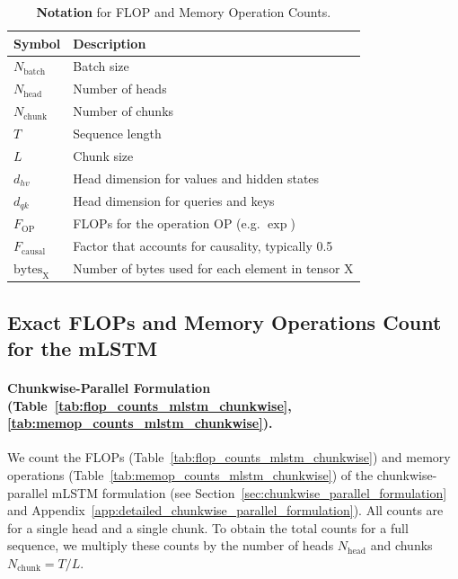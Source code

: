 \documentclass{article}
\begin{document}
    \begin{table}[htbp]
        \vspace{-0.3cm}
        \centering
        \caption{\label{tab:flop_notation} \textbf{Notation} for FLOP and Memory Operation Counts.}
        \vspace{0.2cm}
        \begin{tabular}{ll}
            \toprule
            Symbol                    & Description                                       \\
            \midrule
            $N_\text{batch}$          & Batch size                                        \\
            $N_\text{head}$           & Number of heads                                   \\
            $N_\text{chunk}$          & Number of chunks                                  \\
            $T$                       & Sequence length                                   \\
            $L$                       & Chunk size                                        \\
            $d_{hv}$                  & Head dimension for values and hidden states       \\
            $d_{qk}$                  & Head dimension for queries and keys               \\
            \midrule
            $F_{\text{OP}}$           & FLOPs for the operation OP (e.g. $\exp$)          \\
            $F_{\text{causal}}$       & Factor that accounts for causality, typically 0.5 \\
            $\text{bytes}_{\text{X}}$ & Number of bytes used for each element in tensor X \\
            \bottomrule
        \end{tabular}
        \vspace{-0.2cm}
    \end{table}

    \subsection{Exact FLOPs and Memory Operations Count for the mLSTM}
    \label{app:exact_flops_memops_mlstm}

    \paragraph{Chunkwise-Parallel Formulation (Table~\ref{tab:flop_counts_mlstm_chunkwise}, \ref{tab:memop_counts_mlstm_chunkwise}).}
    We count the FLOPs (Table~\ref{tab:flop_counts_mlstm_chunkwise}) and memory operations (Table~\ref{tab:memop_counts_mlstm_chunkwise}) of the chunkwise-parallel mLSTM formulation (see Section~\ref{sec:chunkwise_parallel_formulation} and Appendix~\ref{app:detailed_chunkwise_parallel_formulation}).
    All counts are for a single head and a single chunk.
    To obtain the total counts for a full sequence, we multiply these counts by the number of heads $N_\text{head}$ and chunks $N_\text{chunk} = T / L$.
\end{document}
